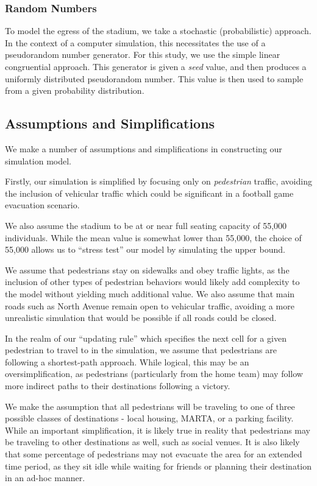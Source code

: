 \documentclass[12pt]{article}
\begin{document}
\subsubsection{Random Numbers}
To model the egress of the stadium, we take a stochastic (probabilistic)
approach. In the context of a computer simulation, this necessitates the use of
a pseudorandom number generator. For this study, we use the simple linear
congruential approach. This generator is given a \textit{seed} value,
and then produces a uniformly distributed pseudorandom number. This value is
then used to sample from a given probability distribution.

\subsection{Assumptions and Simplifications}
We make a number of assumptions and simplifications in constructing our
simulation model.

Firstly, our simulation is simplified by focusing only on
\textit{pedestrian} traffic, avoiding the inclusion of vehicular traffic which
could be significant in a football game evacuation scenario.

We also assume the stadium to be at or near full seating capacity of 55,000
individuals. While the mean value is somewhat lower than 55,000, the choice
of 55,000 allows us to ``stress test'' our model by simulating the upper bound.

We assume that pedestrians stay on sidewalks and obey traffic lights, as the
inclusion of other types of pedestrian behaviors would likely add complexity
to the model without yielding much additional value. We also assume that main
roads such as North Avenue remain open to vehicular traffic, avoiding a more
unrealistic simulation that would be possible if all roads could be closed.

In the realm of our ``updating rule'' which specifies the next cell for a given
pedestrian to travel to in the simulation, we assume that pedestrians are
following a shortest-path approach. While logical, this may be an
oversimplification, as pedestrians (particularly from the home team) may follow
more indirect paths to their destinations following a victory.

We make the assumption that all pedestrians will be traveling to one of three
possible classes of destinations - local housing, MARTA, or a parking facility.
While an important simplification, it is likely true in reality that pedestrians
may be traveling to other destinations as well, such as social venues. It is
also likely that some percentage of pedestrians may not evacuate the area for
an extended time period, as they sit idle while waiting for friends or planning
their destination in an ad-hoc manner.
\end{document}
